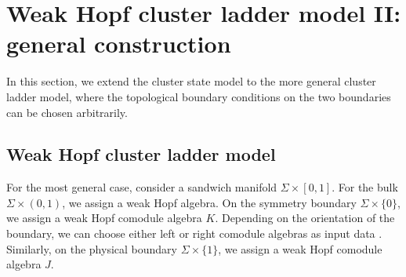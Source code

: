 \documentclass[a4paper,11pt]{article}
\theoremstyle{theorem}
\theoremstyle{remark}
\begin{document}
\section{Weak Hopf cluster ladder model II: general construction}
\label{sec:latticeII}
In this section, we extend the cluster state model to the more general cluster ladder model, where the topological boundary conditions on the two boundaries can be chosen arbitrarily.


\subsection{Weak Hopf cluster ladder model}

For the most general case, consider a sandwich manifold \(\Sigma \times [0,1]\). For the bulk \(\Sigma \times (0,1)\), we assign a weak Hopf algebra. On the symmetry boundary \(\Sigma \times \{0\}\), we assign a weak Hopf comodule algebra \(K\). Depending on the orientation of the boundary, we can choose either left or right comodule algebras as input data \cite{jia2023boundary, Jia2023weak}. Similarly, on the physical boundary \(\Sigma \times \{1\}\), we assign a weak Hopf comodule algebra \(J\).
\end{document}
